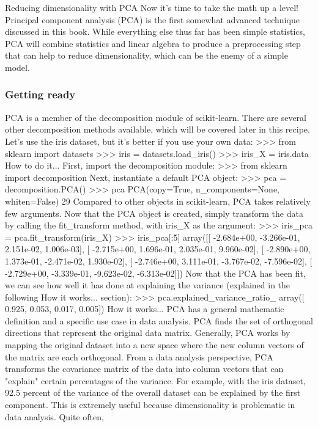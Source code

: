 \documentclass[SKL-MASTER.tex]{subfiles}
\begin{document}
	\Large
Reducing dimensionality with PCA
Now it's time to take the math up a level! Principal component analysis (PCA) is the first
somewhat advanced technique discussed in this book. While everything else thus far has been
simple statistics, PCA will combine statistics and linear algebra to produce a preprocessing step
that can help to reduce dimensionality, which can be the enemy of a simple model.
\subsubsection{Getting ready}
PCA is a member of the decomposition module of scikit-learn. There are several other
decomposition methods available, which will be covered later in this recipe.
Let's use the iris dataset, but it's better if you use your own data:
>>> from sklearn import datasets
>>> iris = datasets.load_iris()
>>> iris_X = iris.data
How to do it...
First, import the decomposition module:
>>> from sklearn import decomposition
Next, instantiate a default PCA object:
>>> pca = decomposition.PCA()
>>> pca
PCA(copy=True, n_components=None, whiten=False)
29
Compared to other objects in scikit-learn, PCA takes relatively few arguments. Now that the
PCA object is created, simply transform the data by calling the fit_transform method,
with iris_X as the argument:
>>> iris_pca = pca.fit_transform(iris_X)
>>> iris_pca[:5]
array([[ -2.684e+00, -3.266e-01, 2.151e-02, 1.006e-03],
[ -2.715e+00, 1.696e-01, 2.035e-01, 9.960e-02],
[ -2.890e+00, 1.373e-01, -2.471e-02, 1.930e-02],
[ -2.746e+00, 3.111e-01, -3.767e-02, -7.596e-02],
[ -2.729e+00, -3.339e-01, -9.623e-02, -6.313e-02]])
Now that the PCA has been fit, we can see how well it has done at explaining the variance
(explained in the following How it works... section):
>>> pca.explained_variance_ratio_
array([ 0.925, 0.053, 0.017, 0.005])
How it works...
PCA has a general mathematic definition and a specific use case in data analysis. PCA finds
the set of orthogonal directions that represent the original data matrix.
Generally, PCA works by mapping the original dataset into a new space where the new column
vectors of the matrix are each orthogonal. From a data analysis perspective, PCA transforms
the covariance matrix of the data into column vectors that can "explain" certain percentages
of the variance. For example, with the iris dataset, 92.5 percent of the variance of the
overall dataset can be explained by the first component.
This is extremely useful because dimensionality is problematic in data analysis. Quite often,
\end{document}
